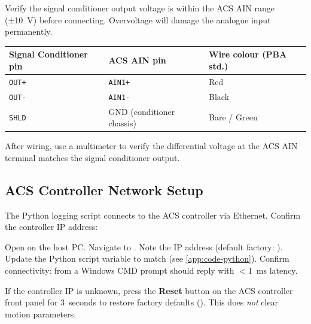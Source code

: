 \begin{cautionbox}
  Verify the signal conditioner output voltage is within the ACS AIN range
  (±\SI{10}{\volt}) before connecting.  Overvoltage will damage the
  analogue input permanently.
\end{cautionbox}

\begin{center}
\begin{tabular}{@{} l l l @{}}
  \toprule
  \textbf{Signal Conditioner pin} & \textbf{ACS AIN pin} & \textbf{Wire colour (PBA std.)} \\
  \midrule
  \texttt{OUT+} & \texttt{AIN1+} & Red \\
  \rowcolor{PBALightGray}
  \texttt{OUT-} & \texttt{AIN1-} & Black \\
  \texttt{SHLD} & GND (conditioner chassis) & Bare / Green \\
  \bottomrule
\end{tabular}
\end{center}

After wiring, use a multimeter to verify the differential voltage at the
ACS AIN terminal matches the signal conditioner output.


\subsection{ACS Controller Network Setup}
\label{sec:setup:network}

The Python logging script connects to the ACS controller via Ethernet.
Confirm the controller IP address:

\begin{steplist}
  \step Open  on the host PC.
  \step Navigate to .
  \step Note the IP address (default factory: ).
        Update the Python script variable  to match
        (see \cref{app:code-python}).
  \step Confirm connectivity:  from a
        Windows CMD prompt should reply with $<$\SI{1}{\milli\second} latency.
\end{steplist}

\begin{notebox}
  If the controller IP is unknown, press the \textbf{Reset} button on the
  ACS controller front panel for 3~seconds to restore factory defaults
  ().  This does \emph{not} clear motion parameters.
\end{notebox}


